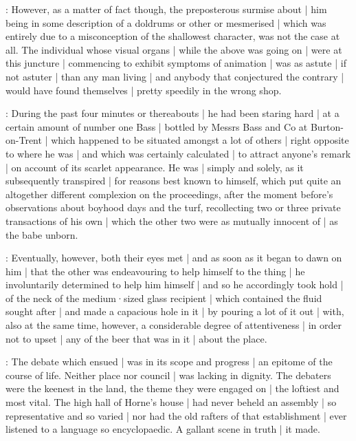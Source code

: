 

:
However,
as a matter of fact though,
the preposterous surmise about |
him being in some description of a doldrums or other or mesmerised |
which was entirely due to a misconception of the shallowest character,
was not the case at all.
The individual whose visual organs |
while the above was going on |
were at this juncture |
commencing to exhibit symptoms of animation |
was as astute |
if not astuter |
than any man living |
and anybody that conjectured the contrary |
would have found themselves |
pretty speedily in the wrong shop.

:
During the past four minutes or thereabouts |
he had been staring hard |
at a certain amount of number one Bass |
bottled by Messrs Bass and Co at Burton-on-Trent |
which happened to be situated amongst a lot of others |
right opposite to where he was |
and which was certainly calculated |
to attract anyone's remark |
on account of its scarlet appearance.
He was |
simply and solely,
as it subsequently transpired |
for reasons best known to himself,
which put quite an altogether different complexion on the proceedings,
after the moment before's observations about boyhood days and the turf,
recollecting two or three private transactions of his own |
which the other two were as mutually innocent of |
as the babe unborn.

:
Eventually,
however,
both their eyes met |
and as soon as it began to dawn on him |
that the other was endeavouring to help himself to the thing |
he involuntarily determined to help him himself |
and so he accordingly took hold |
of the neck of the medium·sized glass recipient |
which contained the fluid sought after |
and made a capacious hole in it |
by pouring a lot of it out |
with,
also at the same time,
however,
a considerable degree of attentiveness |
in order not to upset |
any of the beer that was in it |
about the place.


:
The debate which ensued |
was in its scope and progress |
an epitome of the course of life.
Neither place nor council |
was lacking in dignity.
The debaters were the keenest in the land,
the theme they were engaged on |
the loftiest and most vital.
The high hall of Horne's house |
had never beheld an assembly |
so representative and so varied |
nor had the old rafters of that establishment |
ever listened to a language so encyclopaedic.
A gallant scene in truth |
it made.

